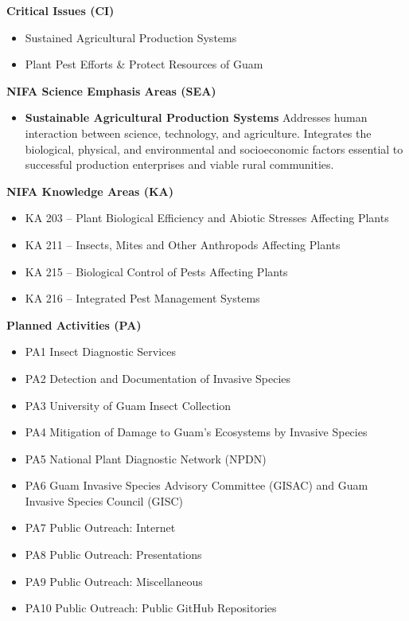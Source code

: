 \textbf{Critical Issues (CI)}
\begin{itemize}
\item Sustained Agricultural Production Systems
\item Plant Pest Efforts \& Protect Resources of Guam
\end{itemize}

\textbf{NIFA Science Emphasis Areas (SEA)}
\begin{itemize}
\item \textbf{Sustainable Agricultural Production Systems} Addresses human interaction between science, technology, and agriculture. Integrates the biological, physical, and environmental and socioeconomic factors essential to successful production enterprises and viable rural communities. 
\end{itemize}

\textbf{NIFA Knowledge Areas (KA)}
\begin{itemize}
\item KA 203 – Plant Biological Efficiency and Abiotic Stresses Affecting Plants
\item KA 211 – Insects, Mites and Other Anthropods Affecting Plants
\item KA 215 – Biological Control of Pests Affecting Plants
\item KA 216 – Integrated Pest Management Systems
\end{itemize}

\textbf{Planned Activities (PA)}
\begin{itemize}
\item PA1 Insect Diagnostic Services
\item PA2 Detection and Documentation of Invasive Species
\item PA3 University of Guam Insect Collection
\item PA4 Mitigation of Damage to Guam's Ecosystems by Invasive Species
\item PA5 National Plant Diagnostic Network (NPDN)
\item PA6 Guam Invasive Species Advisory Committee (GISAC) and Guam Invasive Species Council (GISC)
\item PA7 Public Outreach: Internet
\item PA8 Public Outreach: Presentations
\item PA9 Public Outreach: Miscellaneous
\item PA10 Public Outreach: Public GitHub Repositories
\end{itemize}

